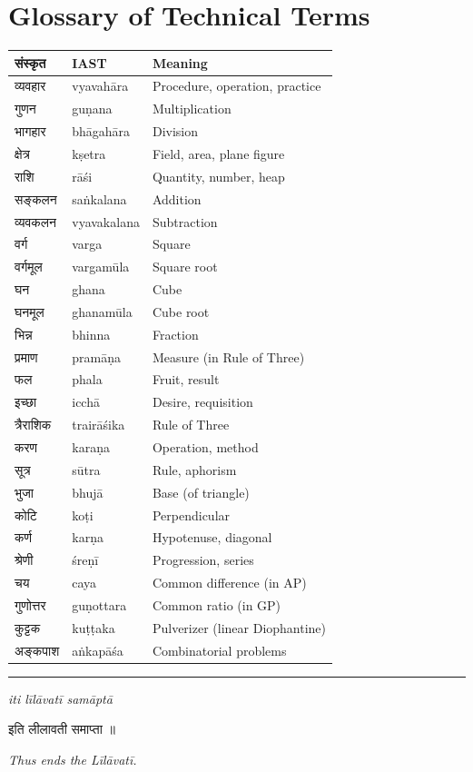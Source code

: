 \documentclass[11pt,a4paper]{article}
\begin{document}
\newpage

\section*{Glossary of Technical Terms}

\begin{longtable}{>{\devanagarifont}l l p{6cm}}
\toprule
\textbf{संस्कृत} & \textbf{IAST} & \textbf{Meaning} \\
\midrule
\endhead
व्यवहार & vyavahāra & Procedure, operation, practice \\
गुणन & guṇana & Multiplication \\
भागहार & bhāgahāra & Division \\
क्षेत्र & kṣetra & Field, area, plane figure \\
राशि & rāśi & Quantity, number, heap \\
सङ्कलन & saṅkalana & Addition \\
व्यवकलन & vyavakalana & Subtraction \\
वर्ग & varga & Square \\
वर्गमूल & vargamūla & Square root \\
घन & ghana & Cube \\
घनमूल & ghanamūla & Cube root \\
भिन्न & bhinna & Fraction \\
प्रमाण & pramāṇa & Measure (in Rule of Three) \\
फल & phala & Fruit, result \\
इच्छा & icchā & Desire, requisition \\
त्रैराशिक & trairāśika & Rule of Three \\
करण & karaṇa & Operation, method \\
सूत्र & sūtra & Rule, aphorism \\
भुजा & bhujā & Base (of triangle) \\
कोटि & koṭi & Perpendicular \\
कर्ण & karṇa & Hypotenuse, diagonal \\
श्रेणी & śreṇī & Progression, series \\
चय & caya & Common difference (in AP) \\
गुणोत्तर & guṇottara & Common ratio (in GP) \\
कुट्टक & kuṭṭaka & Pulverizer (linear Diophantine) \\
अङ्कपाश & aṅkapāśa & Combinatorial problems \\
\bottomrule
\end{longtable}

\vspace{1em}

\begin{center}
\rule{0.6\textwidth}{0.6pt}

\vspace{0.5em}

\textit{iti līlāvatī samāptā}

\vspace{0.3em}

{\devanagarifont इति लीलावती समाप्ता ॥}

\vspace{0.5em}

\textit{Thus ends the Līlāvatī.}

\end{center}
\end{document}
